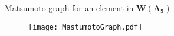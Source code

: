 \documentclass[final]{beamer}
\begin{document}
\begin{frame}{}
\begin{columns}[T]
\begin{column}{.33\linewidth}
\begin{block}{Matsumoto graph for an element in $\mathbf{W(A_3)}$}
\begin{figure}
\begin{center}
\texttt{[image: MastumotoGraph.pdf]}
%
%
\end{center}
\end{figure}

\end{block}



\end{column}


\begin{column}{.33\linewidth}


\end{column}
\end{columns}
\end{frame}
\end{document}
